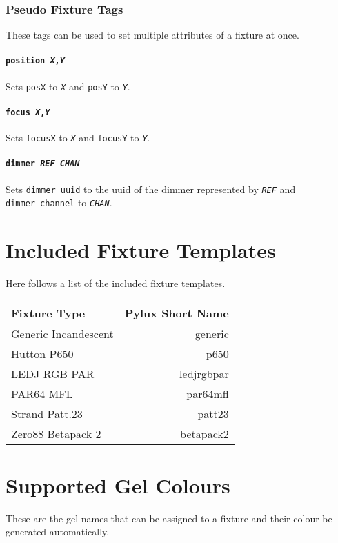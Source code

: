 \documentclass[a4paper]{article}
\begin{document}
\subsubsection{Pseudo Fixture Tags}
These tags can be used to set multiple attributes of a fixture at once.

\paragraph{\texttt{position \textit{X},\textit{Y}}}
Sets \texttt{posX} to \texttt{\textit{X}} and \texttt{posY} to 
\texttt{\textit{Y}}.

\paragraph{\texttt{focus \textit{X},\textit{Y}}}
Sets \texttt{focusX} to \texttt{\textit{X}} and \texttt{focusY} to 
\texttt{\textit{Y}}.

\paragraph{\texttt{dimmer \textit{REF} \textit{CHAN}}}
Sets \texttt{dimmer\_uuid} to the uuid of the dimmer represented by 
\texttt{\textit{REF}} and \texttt{dimmer\_channel} to \texttt{\textit{CHAN}}.

\appendix
\section{Included Fixture Templates}
Here follows a list of the included fixture templates.
\begin{longtable}{|l|r|}
\hline
Fixture Type & Pylux Short Name \\ \hline
Generic Incandescent & generic \\
Hutton P650 & p650 \\
LEDJ RGB PAR & ledjrgbpar \\
PAR64 MFL & par64mfl \\
Strand Patt.23 & patt23 \\
Zero88 Betapack 2 & betapack2 \\
\hline
\end{longtable}

\section{Supported Gel Colours}
These are the gel names that can be assigned to a fixture and their colour be 
generated automatically.
\end{document}
